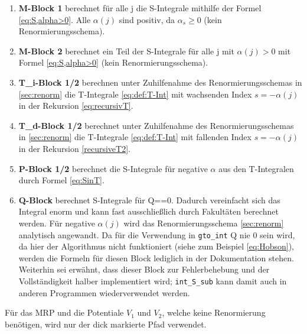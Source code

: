 \begin{enumerate}
	\item \textbf{M-Block 1} berechnet für alle j die S-Integrale mithilfe der 
	Formel 
	\ref{eq:S,alpha>0}. Alle $\alpha(j)$ sind positiv, da $\alpha_s \geq0$ 
	(kein Renormierungsschema).
	\item \textbf{M-Block 2} berechnet ein Teil der S-Integrale für alle j mit 
	$\alpha(j)>0$ mit Formel \ref{eq:S,alpha>0} (kein Renormierungsschema). 
	\item \textbf{T\_i-Block 1/2} berechnen unter Zuhilfenahme des 
	Renormierungsschemas in \ref{sec:renorm} die T-Integrale \ref{eq:def:T-Int} 
	mit wachsenden Index $s=-\alpha(j)$ in der Rekursion \ref{eq:recursivT}.
	\item \textbf{T\_d-Block 1/2} berechnet unter Zuhilfenahme des 
	Renormierungsschemas in \ref{sec:renorm} die T-Integrale \ref{eq:def:T-Int} 
	mit fallenden Index $s=-\alpha(j)$ in der Rekursion \ref{recursiveT2}.
	\item \textbf{P-Block 1/2} berechnet die S-Integrale für negative $\alpha$ 
	aus den T-Integralen durch Formel \ref{eq:SinT}.
	\item \textbf{Q-Block} berechnet S-Integrale für Q==0. Dadurch vereinfacht 
	sich das Integral enorm und kann fast ausschließlich durch Fakultäten 
	berechnet werden. Für negative $\alpha(j)$ wird das Renormierungsschema 
	\ref{sec:renorm} analytisch angewandt. Da für die Verwendung in 
	\texttt{gto\_int} Q 
	nie 0 sein wird, da hier der Algorithmus nicht funktioniert (siehe zum 
	Beispiel \ref{eq:Hobson}), werden die Formeln für diesen Block lediglich in 
	der Dokumentation stehen. Weiterhin sei erwähnt, dass dieser Block zur 
	Fehlerbehebung und der Vollständigkeit halber implementiert wird; 
	\texttt{int\_S\_sub} kann damit auch in anderen Programmen wiederverwendet 
	werden.
\end{enumerate}
%
Für das MRP und die Potentiale $V_1$ und $V_2$, welche keine Renormierung 
benötigen, wird nur der dick markierte Pfad verwendet.
%
%
%
